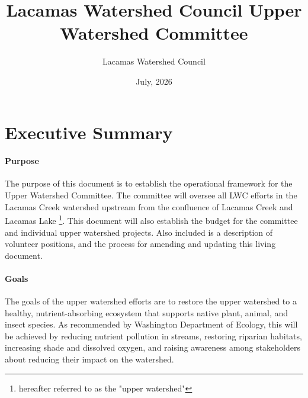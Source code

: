 \documentclass[letterpaper,11pt,leqno]{article}
\begin{document}
\title{Lacamas Watershed Council Upper Watershed Committee}

\author{Lacamas Watershed Council}
%

\date{July, 2026}   


\begin{titlepage}
\maketitle


\end{titlepage}

\section{Executive Summary}\label{s:ExecutiveSummary}

\paragraph{Purpose} The purpose of this document is to establish the operational framework for the Upper Watershed Committee.
The committee will oversee all LWC efforts in the Lacamas Creek 
watershed upstream from the confluence of Lacamas Creek and Lacamas Lake \footnote{hereafter referred to as the "upper watershed"}.
This document will also establish the budget for the committee and individual upper watershed projects. Also included is a description
of volunteer positions, and the process for amending and updating this living document.

\paragraph{Goals} The goals of the upper watershed efforts are to restore the upper watershed to a healthy, nutrient-absorbing ecosystem that supports
native plant, animal, and insect species. As recommended by Washington Department of Ecology, this will be achieved by reducing nutrient pollution in streams, restoring riparian habitats, increasing shade and dissolved oxygen,
and raising awareness among stakeholders about reducing their impact on the watershed.
\end{document}
